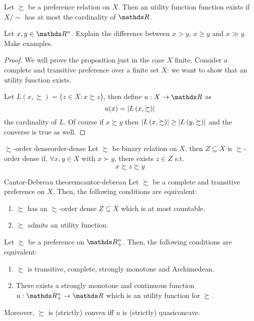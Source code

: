 \documentclass[12pt]{extarticle}
\begin{document}
\begin{proposition}{}{}
	Let $\succsim$ be a preference relation on $X$.
	Then an utility function function exists if $X/\sim$ has at most the cardinality of $\R$.
\end{proposition}

\begin{proposition}{}{}
	Let $x, y \in \R^n$. Explain the difference between $x > y$, $x \geq y$ and $x \gg y$. Make examples.
\end{proposition}

\begin{proof}
	We will prove the proposition just in the case $X$ finite.
	Consider a complete and transitive preference over a finite set $X$:
	we want to show that an utility function exists.

	Let $L(x, \succsim) = \{ z \in X : x \succsim z \}$, then define $u: X \to \R$ as
	\begin{equation}
		u(x) = \abs{L\left(x, \succsim\right)}
	\end{equation}
	the cardinality of $L$.
	Of course if $x \succsim y$ then $\abs{L\left(x, \succsim\right)} \geq \abs{L\left(y, \succsim\right)}$
	and the converse is true as well.
\end{proof}

\begin{definition}{$\succsim$-order dense}{order-dense}
	Let $\succsim$ be binary relation on $X$, then $Z \subseteq X$ is $\succsim$-order dense if, $\forall x, y \in X$ with $x \succ y$, there exists $z \in Z$ s.t.
	\begin{equation}
		x \succsim z \succsim y
	\end{equation}
\end{definition}

\begin{theorem}{Cantor-Debreau theorem}{cantor-debreau}
	Let $\succsim$ be a complete and transitive preference on $X$.
	Then, the following conditions are equivalent:
	\begin{enumerate}[label=\roman*.]
		\item $\succsim$ has an $\succsim$-order dense $Z \subseteq X$ which is at most countable.
		\item $\succsim$ admits an utility function.
	\end{enumerate}
\end{theorem}

\begin{theorem}{}{}
	Let $\succsim$ be a preference on $\R^n_+$.
	Then, the following conditions are equivalent:
	\begin{enumerate}[label=\roman*.]
		\item $\succsim$ is transitive, complete, strongly monotone and Archimedean.
		\item There exists a strongly monotone and continuous function $u: \R^n_+ \to \R$ which is an utility function for $\succsim$.
	\end{enumerate}

	Moreover, $\succsim$ is (strictly) convex iff $u$ is (strictly) quasiconcave.
\end{theorem}
\end{document}
